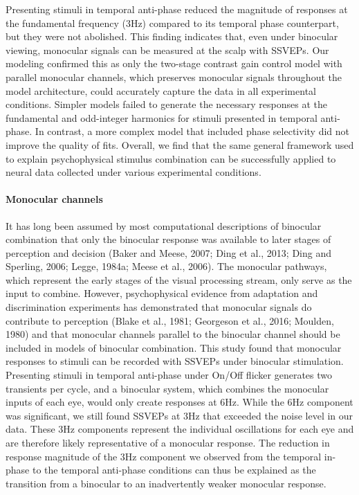 \documentclass[
  12pt,
]{article}
\let\oldparagraph\paragraph
\renewcommand{\paragraph}[1]{\oldparagraph{#1}\mbox{}}
\begin{document}
Presenting stimuli in temporal anti-phase reduced the magnitude of
responses at the fundamental frequency (3Hz) compared to its temporal
phase counterpart, but they were not abolished. This finding indicates
that, even under binocular viewing, monocular signals can be measured at
the scalp with SSVEPs. Our modeling confirmed this as only the two-stage
contrast gain control model with parallel monocular channels, which
preserves monocular signals throughout the model architecture, could
accurately capture the data in all experimental conditions. Simpler
models failed to generate the necessary responses at the fundamental and
odd-integer harmonics for stimuli presented in temporal anti-phase. In
contrast, a more complex model that included phase selectivity did not
improve the quality of fits. Overall, we find that the same general
framework used to explain psychophysical stimulus combination can be
successfully applied to neural data collected under various experimental
conditions.

\paragraph{Monocular channels}\label{monocular-channels}

It has long been assumed by most computational descriptions of binocular
combination that only the binocular response was available to later
stages of perception and decision (Baker and Meese, 2007; Ding et al.,
2013; Ding and Sperling, 2006; Legge, 1984a; Meese et al., 2006). The
monocular pathways, which represent the early stages of the visual
processing stream, only serve as the input to combine. However,
psychophysical evidence from adaptation and discrimination experiments
has demonstrated that monocular signals do contribute to perception
(Blake et al., 1981; Georgeson et al., 2016; Moulden, 1980) and that
monocular channels parallel to the binocular channel should be included
in models of binocular combination. This study found that monocular
responses to stimuli can be recorded with SSVEPs under binocular
stimulation. Presenting stimuli in temporal anti-phase under On/Off
flicker generates two transients per cycle, and a binocular system,
which combines the monocular inputs of each eye, would only create
responses at 6Hz. While the 6Hz component was significant, we still
found SSVEPs at 3Hz that exceeded the noise level in our data. These 3Hz
components represent the individual oscillations for each eye and are
therefore likely representative of a monocular response. The reduction
in response magnitude of the 3Hz component we observed from the temporal
in-phase to the temporal anti-phase conditions can thus be explained as
the transition from a binocular to an inadvertently weaker monocular
response.
\end{document}
